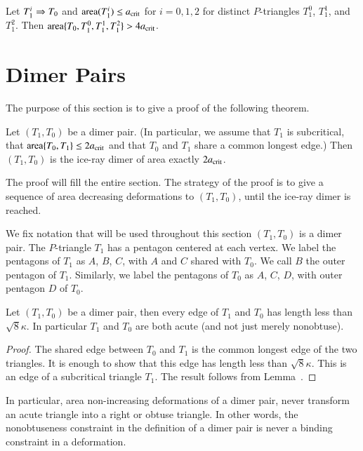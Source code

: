 \begin{lemma}
  Let $T_1^i\Rightarrow T_0$ and ${\operatorname{area}}(T_1^i)\le a_\text{crit}$ for $i=0,1,2$ for
  distinct $P$-triangles $T_1^0$, $T_1^1$, and $T_1^2$.  Then
  ${\operatorname{area}}\{T_0,T_1^0,T_1^1,T_1^2\} > 4a_\text{crit}$.
\end{lemma}


\section{Dimer Pairs}

The purpose of this section is to give a proof of the following
theorem.


\begin{theorem}
  Let $(T_1,T_0)$ be a dimer pair.  (In particular, we assume that
  $T_1$ is subcritical, that ${\operatorname{area}}\{T_0,T_1\}\le 2a_\text{crit}$ and that
  $T_0$ and $T_1$ share a common longest edge.)  Then $(T_1,T_0)$ is
  the ice-ray dimer of area exactly $2a_\text{crit}$.
\end{theorem}

The proof will fill the entire section.  The strategy of the proof is
to give a sequence of area decreasing deformations to $(T_1,T_0)$,
until the ice-ray dimer is reached.

We fix notation that will be used throughout this section $(T_1,T_0)$
is a dimer pair.  The $P$-triangle $T_1$ has a pentagon centered at
each vertex.  We label the pentagons of $T_1$ as $A$, $B$, $C$, with
$A$ and $C$ shared with $T_0$.  We call $B$ the outer pentagon of
$T_1$.  Similarly, we label the pentagons of $T_0$ as $A$, $C$, $D$,
with outer pentagon $D$ of $T_0$.


\begin{lemma}  
  Let $(T_1,T_0)$ be a dimer pair, then every edge of $T_1$ and $T_0$
  has length less than $\sqrt8\kappa$.  In particular $T_1$ and $T_0$
  are both acute (and not just merely nonobtuse).
\end{lemma}

\begin{proof}  
  The shared edge between $T_0$ and $T_1$ is the common longest edge
  of the two triangles.  It is enough to show that this edge has
  length less than $\sqrt8\kappa$.  This is an edge of a subcritical
  triangle $T_1$. The result follows from Lemma~.
\end{proof}

In particular, area non-increasing deformations of a dimer pair, never
transform an acute triangle into a right or obtuse triangle.  In other
words, the nonobtuseness constraint in the definition of a dimer pair
is never a binding constraint in a deformation.

